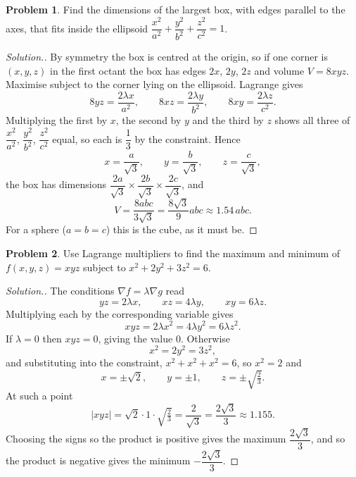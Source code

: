 \documentclass[11pt,a4paper]{article}
\theoremstyle{definition}
\newtheorem{problemx}{Problem}[subsection]
\newenvironment{problem}{\begin{problemx}}{\end{problemx}}
\newenvironment{solution}
  {\renewcommand{\qedsymbol}{}\begin{proof}[\textit{Solution}.]}
  {\end{proof}}
\begin{document}
\begin{problem}
Find the dimensions of the largest box, with edges parallel to the axes, that
fits inside the ellipsoid
$\dfrac{x^2}{a^2}+\dfrac{y^2}{b^2}+\dfrac{z^2}{c^2} = 1$.
\end{problem}
\begin{solution}
By symmetry the box is centred at the origin, so if one corner is $(x,y,z)$ in
the first octant the box has edges $2x$, $2y$, $2z$ and volume $V = 8xyz$.
Maximise subject to the corner lying on the ellipsoid. Lagrange gives
$$8yz = \frac{2\lambda x}{a^2},\qquad 8xz = \frac{2\lambda y}{b^2},
\qquad 8xy = \frac{2\lambda z}{c^2}.$$
Multiplying the first by $x$, the second by $y$ and the third by $z$ shows all
three of $\dfrac{x^2}{a^2}$, $\dfrac{y^2}{b^2}$, $\dfrac{z^2}{c^2}$ equal, so
each is $\dfrac13$ by the constraint. Hence
$$x = \frac{a}{\sqrt3},\qquad y = \frac{b}{\sqrt3},\qquad z = \frac{c}{\sqrt3},$$
the box has dimensions $\dfrac{2a}{\sqrt3}\times\dfrac{2b}{\sqrt3}\times
\dfrac{2c}{\sqrt3}$, and
$$V = \frac{8abc}{3\sqrt3} = \frac{8\sqrt3}{9}abc\approx 1.54\,abc .$$
For a sphere ($a=b=c$) this is the cube, as it must be.
\end{solution}

\begin{problem}
Use Lagrange multipliers to find the maximum and minimum of $f(x,y,z) = xyz$
subject to $x^2+2y^2+3z^2 = 6$.
\end{problem}
\begin{solution}
The conditions $\nabla f = \lambda\nabla g$ read
$$yz = 2\lambda x,\qquad xz = 4\lambda y,\qquad xy = 6\lambda z .$$
Multiplying each by the corresponding variable gives
$$xyz = 2\lambda x^2 = 4\lambda y^2 = 6\lambda z^2 .$$
If $\lambda = 0$ then $xyz = 0$, giving the value $0$. Otherwise
$$x^2 = 2y^2 = 3z^2 ,$$
and substituting into the constraint, $x^2+x^2+x^2 = 6$, so $x^2 = 2$ and
$$x = \pm\sqrt2,\qquad y = \pm 1,\qquad z = \pm\sqrt{\tfrac23}.$$
At such a point
$$\left|xyz\right| = \sqrt2\cdot 1\cdot\sqrt{\tfrac23} = \frac{2}{\sqrt3}
= \frac{2\sqrt3}{3}\approx 1.155 .$$
Choosing the signs so the product is positive gives the maximum
$\dfrac{2\sqrt3}{3}$, and so the product is negative gives the minimum
$-\dfrac{2\sqrt3}{3}$.
\end{solution}
\end{document}
